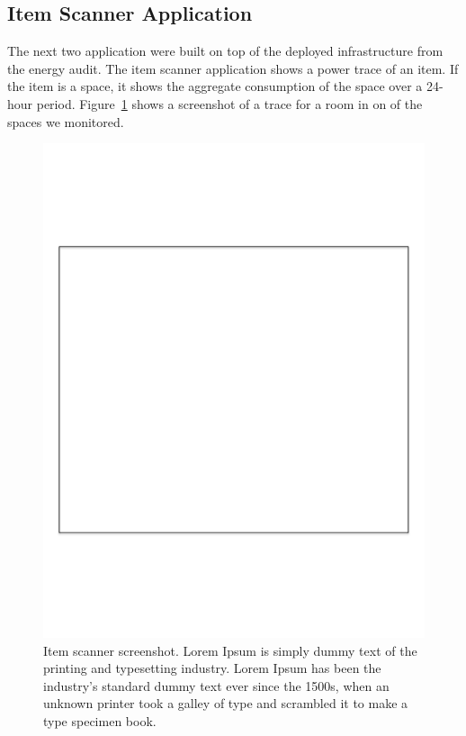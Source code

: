 \subsection{Item Scanner Application}
The next two application were built on top of the deployed infrastructure from the energy audit.
The item scanner application shows a power trace of an item.  If the item is a space, it shows
the aggregate consumption of the space over a 24-hour period.  Figure~\ref{fig:itemscanscreen}
shows a screenshot of a trace for a room in on of the spaces we monitored.

\begin{figure}[htb!]
\begin{center}
\includegraphics[scale=0.39]{figs/blankbox}
\caption{Item scanner screenshot. Lorem Ipsum is simply dummy text of the printing and typesetting industry. Lorem Ipsum has 
been the industry's standard dummy text ever since the 1500s, when an unknown printer took a galley of 
type and scrambled it to make a type specimen book.  }
\label{fig:itemscanscreen}
\end{center}
\end{figure}

